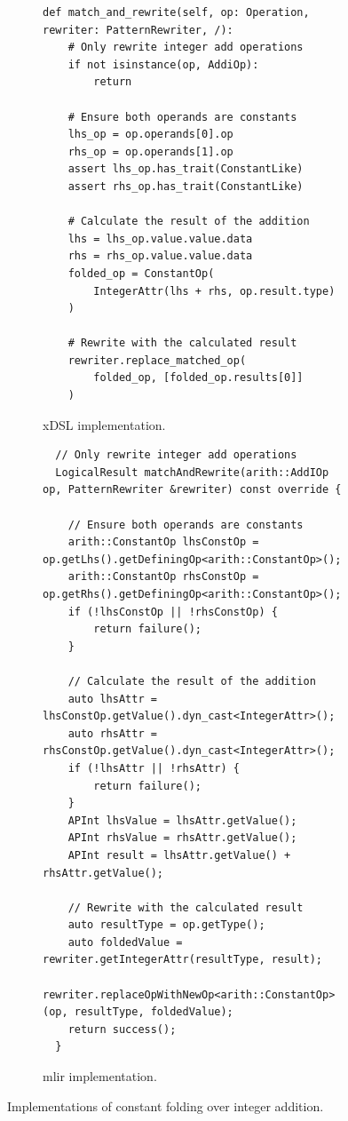\begin{figure}[H]
    \centering
    \begin{subfigure}[b]{0.45\textwidth}
       \centering
        \begin{verbatim}
def match_and_rewrite(self, op: Operation, rewriter: PatternRewriter, /):
    # Only rewrite integer add operations
    if not isinstance(op, AddiOp):
        return

    # Ensure both operands are constants
    lhs_op = op.operands[0].op
    rhs_op = op.operands[1].op
    assert lhs_op.has_trait(ConstantLike)
    assert rhs_op.has_trait(ConstantLike)

    # Calculate the result of the addition
    lhs = lhs_op.value.value.data
    rhs = rhs_op.value.value.data
    folded_op = ConstantOp(
        IntegerAttr(lhs + rhs, op.result.type)
    )

    # Rewrite with the calculated result
    rewriter.replace_matched_op(
        folded_op, [folded_op.results[0]]
    )
        \end{verbatim}
        \footnotesize\vspace{5em}
        \captionsetup{name=Listing}
        \caption{xDSL implementation.}
        \label{listing:constant-folding-impl-xdsl}
    \end{subfigure}
    \hfill
    \begin{subfigure}[b]{0.5\textwidth}
        \centering
        \begin{verbatim}
  // Only rewrite integer add operations
  LogicalResult matchAndRewrite(arith::AddIOp op, PatternRewriter &rewriter) const override {

    // Ensure both operands are constants
    arith::ConstantOp lhsConstOp = op.getLhs().getDefiningOp<arith::ConstantOp>();
    arith::ConstantOp rhsConstOp = op.getRhs().getDefiningOp<arith::ConstantOp>();
    if (!lhsConstOp || !rhsConstOp) {
        return failure();
    }

    // Calculate the result of the addition
    auto lhsAttr = lhsConstOp.getValue().dyn_cast<IntegerAttr>();
    auto rhsAttr = rhsConstOp.getValue().dyn_cast<IntegerAttr>();
    if (!lhsAttr || !rhsAttr) {
        return failure();
    }
    APInt lhsValue = lhsAttr.getValue();
    APInt rhsValue = rhsAttr.getValue();
    APInt result = lhsAttr.getValue() + rhsAttr.getValue();

    // Rewrite with the calculated result
    auto resultType = op.getType();
    auto foldedValue = rewriter.getIntegerAttr(resultType, result);
    rewriter.replaceOpWithNewOp<arith::ConstantOp>(op, resultType, foldedValue);
    return success();
  }
        \end{verbatim}
        \captionsetup{name=Listing}
        \caption{\ac{mlir} implementation.}
        \label{listing:constant-folding-impl-mlir}
    \end{subfigure}
    \vspace{1em}
    \captionsetup{name=Listing}
    \caption{Implementations of constant folding over integer addition.}
    \label{listing:constant-folding-impl}
\end{figure}


